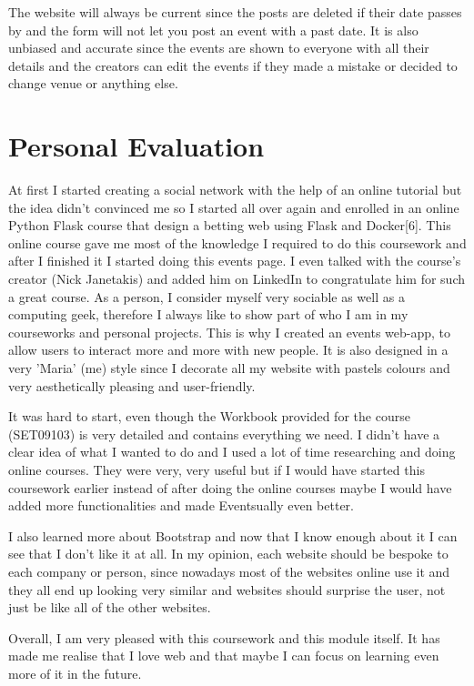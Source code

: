 \documentclass[10pt, a4paper]{article}
\begin{document}
The website will always be current since the posts are deleted if their date passes by and the form will not let you post an event with a past date. It is also unbiased and accurate since the events are shown to everyone with all their details and the creators can edit the events if they made a mistake or decided to change venue or anything else.

    \section{Personal Evaluation}

At first I started creating a social network with the help of an online tutorial but the idea didn't convinced me so I started all over again and enrolled in an online Python Flask course that design a betting web using Flask and Docker[6]. This online course gave me most of the knowledge I required to do this coursework and after I finished it I started doing this events page. I even talked with the course's creator (Nick Janetakis) and added him on LinkedIn to congratulate him for such a great course. As a person, I consider myself very sociable as well as a computing geek, therefore I always like to show part of who I am in my courseworks and personal projects. This is why I created an events web-app, to allow users to interact more and more with new people. It is also designed in a very 'Maria' (me) style since I decorate all my website with pastels colours and very aesthetically pleasing and user-friendly.

It was hard to start, even though the Workbook provided for the course (SET09103) is very detailed and contains everything we need. I didn't have a clear idea of what I wanted to do and I used a lot of time researching and doing online courses. They were very, very useful but if I would have started this coursework earlier instead of after doing the online courses maybe I would have added more functionalities and made Eventsually even better.

I also learned more about Bootstrap and now that I know enough about it I can see that I don't like it at all. In my opinion, each website should be bespoke to each company or person, since nowadays most of the websites online use it and they all end up looking very similar and websites should surprise the user, not just be like all of the other websites.

Overall, I am very pleased with this coursework and this module itself. It has made me realise that I love web and that maybe I can focus on learning even more of it in the future.
\end{document}
